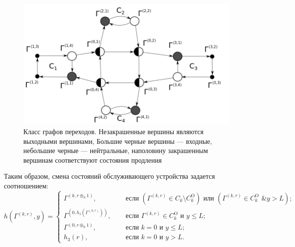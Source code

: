\documentclass[a4paper,12pt,russian]{extarticle}
\begin{document}
\begin{figure}[h]\centering
\includegraphics[scale=0.5]{GraphScheme3_grayscale.png} 
\caption{Класс графов переходов. Незакрашенные вершины являются выходными вершинами, Большие черные вершины --- входные, небольшие черные --- нейтральные, наполовину закрашенным вершинам соответствуют состояния продления}
\label{GraphScheme}
\end{figure}

Таким образом, смена состояний обслуживающего устройства задается соотношением:
\begin{equation}
h(\Gamma^{(k,r)},y) = 
\begin{cases}
\Gamma^{(k,r \oplus_k 1)},& \quad \text{ если } (\Gamma^{(k,r)}\in C_k\setminus C_k^{\mathrm{O}}) \text{ или } (\Gamma^{(k,r)}\in C_k^{\mathrm{O}} \text{ \& } y>L);\\
\Gamma^{(0,h_1(\Gamma^{(k,r)}))},& \quad \text{ если } \Gamma^{(k,r)}\in C_k^{\mathrm{O}} \text{ и } y\leqslant L;\\
\Gamma^{(0,r \oplus_0 1)},& \quad \text{ если } k=0 \text{ и } y\leqslant L;\\
h_3(r),& \quad \text{ если } k=0 \text{ и } y > L.
\end{cases}
\label{hLaw}
\end{equation}
\end{document}
